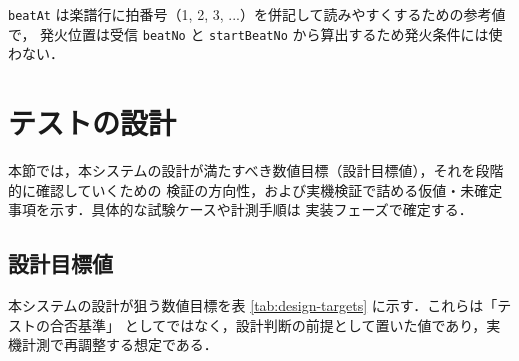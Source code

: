 \documentclass[lualatex,book,paper=a4paper,jafontsize=11.5pt,jafontscale=1.05]{jlreq}
\begin{document}
\texttt{beatAt} は楽譜行に拍番号（1, 2, 3, ...）を併記して読みやすくするための参考値で，
発火位置は受信 \texttt{beatNo} と \texttt{startBeatNo} から算出するため発火条件には使わない．


\section{テストの設計}\label{sec:test-design}

本節では，本システムの設計が満たすべき数値目標（設計目標値），それを段階的に確認していくための
検証の方向性，および実機検証で詰める仮値・未確定事項を示す．具体的な試験ケースや計測手順は
実装フェーズで確定する．

\subsection{設計目標値}\label{subsec:design-targets}

本システムの設計が狙う数値目標を表 \ref{tab:design-targets} に示す．これらは「テストの合否基準」
としてではなく，設計判断の前提として置いた値であり，実機計測で再調整する想定である．
\end{document}
